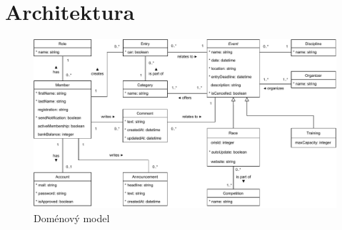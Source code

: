 \section{Architektura}

\begin{landscape}
	\begin{figure}[h]
		\caption{Doménový model}
		\label{figure:domain-model}
		\centering
		\includegraphics[width=0.9\linewidth]{images/domain-model.pdf}
	\end{figure}
\end{landscape}

